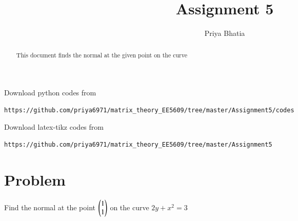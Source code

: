 \documentclass[journal,12pt,twocolumn]{IEEEtran}
\begin{document}
     \def\rightbox#1{\makebox[0in][r]{#1}}
     \def\centbox#1{\makebox[0in]{#1}}
     \def\topbox#1{\raisebox{-\baselineskip}[0in][0in]{#1}}
     \def\midbox#1{\raisebox{-0.5\baselineskip}[0in][0in]{#1}}
\vspace{3cm}
\title{Assignment 5}
\author{Priya Bhatia}
\maketitle
\newpage
\bigskip
\renewcommand{\thefigure}{\theenumi}
\renewcommand{\thetable}{\theenumi}
\begin{abstract}
This document finds the normal at the given point on the curve
\end{abstract}
%
Download python codes from 
%
\begin{lstlisting}
https://github.com/priya6971/matrix_theory_EE5609/tree/master/Assignment5/codes
\end{lstlisting}
%
%
Download latex-tikz codes from 
%
\begin{lstlisting}
https://github.com/priya6971/matrix_theory_EE5609/tree/master/Assignment5
\end{lstlisting}
%
\section{\textbf{Problem}}
Find the normal at the point $\begin{pmatrix}1\\1\end{pmatrix}$ on the curve $2y + x^2 = 3$
\end{document}
